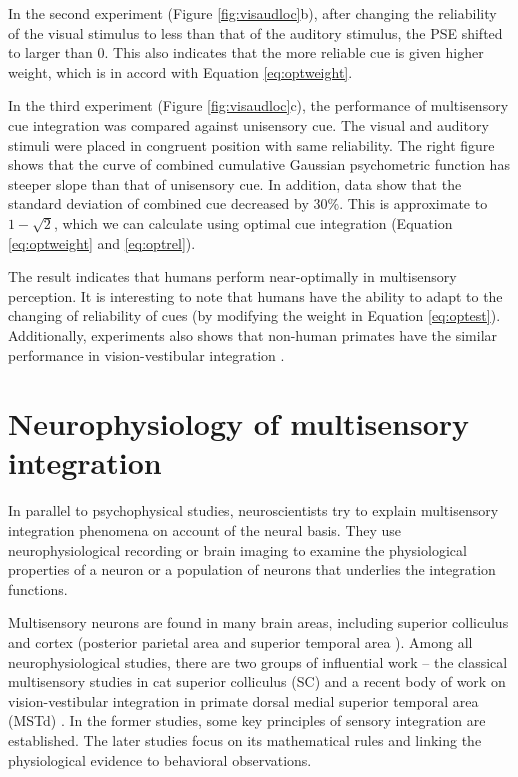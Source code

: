\documentclass{article}[11pt]
\begin{document}
In the second experiment (Figure \ref{fig:visaudloc}b), after changing the reliability of the visual stimulus to less than that of the auditory stimulus, the PSE shifted to larger than 0. This also indicates that the more reliable cue is given higher weight, which is in accord with Equation \ref{eq:optweight}.

In the third experiment (Figure \ref{fig:visaudloc}c), the performance of multisensory cue integration was compared against unisensory cue. The visual and auditory stimuli were placed in congruent position with same reliability. The right figure shows that the curve of combined cumulative Gaussian psychometric function has steeper slope than that of unisensory cue. In addition, data show that the standard deviation of combined cue decreased by $30\%$. This is approximate to $1-\sqrt{2}$, which we can calculate using optimal cue integration (Equation \ref{eq:optweight} and \ref{eq:optrel}).

The result indicates that humans perform near-optimally in multisensory perception. It is interesting to note that humans have the ability to adapt to the changing of reliability of cues (by modifying the weight in Equation \ref{eq:optest}). Additionally, experiments also shows that non-human primates have the similar performance in vision-vestibular integration \cite{gu_neural_2008}.

\section{Neurophysiology of multisensory integration}
In parallel to psychophysical studies, neuroscientists try to explain multisensory integration phenomena on account of the neural basis.
They use neurophysiological recording or brain imaging to examine the physiological properties of a neuron or a population of neurons that underlies the integration functions.


Multisensory neurons are found in many brain areas, including superior colliculus \cite{stein_merging_1993} and cortex (posterior parietal area \cite{graziano_system_2001} and superior temporal area \cite{alais_multisensory_2010}).
Among all neurophysiological studies, there are two groups of influential work -- the classical multisensory studies in cat superior colliculus (SC) \cite{stein_merging_1993, stein_multisensory_2008} and a recent body of work on vision-vestibular integration in primate dorsal medial superior temporal area (MSTd) \cite{morgan_multisensory_2008, fetsch_visualvestibular_2010}.
In the former studies, some key principles of sensory integration are established. The later studies focus on its mathematical rules and linking the physiological evidence to behavioral observations.
\end{document}
